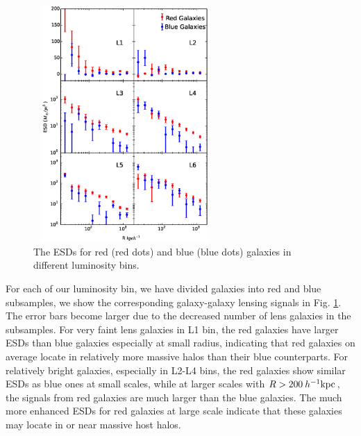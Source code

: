 \documentclass[apj]{emulateapj}
\newcommand{\kpch}{\>h^{-1}{\rm {kpc}}}
\begin{document}
\begin{figure}
\centering
\includegraphics[width=7cm,height=9cm]{f7.eps}
\caption{The ESDs for  red (red dots) and blue (blue dots) galaxies in
  different luminosity bins.}
  \label{fig:Lbin_color}
\end{figure}





For each of our luminosity bin, we have divided galaxies into red and
blue subsamples, we show the corresponding galaxy-galaxy lensing
signals in Fig.  \ref{fig:Lbin_color}. The error bars become larger
due to the decreased number of lens galaxies in the subsamples. For
very faint lens galaxies in L1 bin, the red galaxies have larger ESDs
than blue galaxies especially at small radius, indicating that red
galaxies on average locate in relatively more massive halos than their
blue counterparts.  For relatively bright galaxies, especially in
L2-L4 bins, the red galaxies show similar ESDs as blue ones at small
scales, while at larger scales with $R> 200 \kpch$, the signals from
red galaxies are much larger than the blue galaxies. The much more
enhanced ESDs for red galaxies at large scale indicate that these
galaxies may locate in or near massive host halos.




\end{document}

